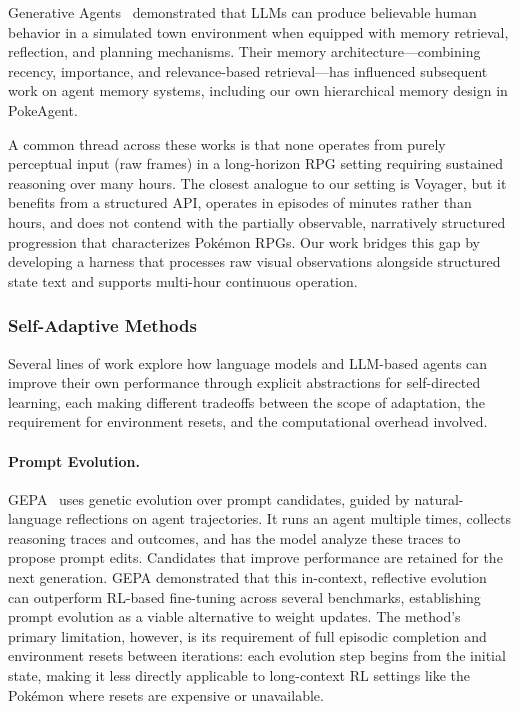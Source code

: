 Generative Agents~\citep{park2023generative} demonstrated that LLMs can produce believable human behavior in a simulated town environment when equipped with memory retrieval, reflection, and planning mechanisms. Their memory architecture---combining recency, importance, and relevance-based retrieval---has influenced subsequent work on agent memory systems, including our own hierarchical memory design in PokeAgent.

A common thread across these works is that none operates from purely perceptual input (raw frames) in a long-horizon RPG setting requiring sustained reasoning over many hours. The closest analogue to our setting is Voyager, but it benefits from a structured API, operates in episodes of minutes rather than hours, and does not contend with the partially observable, narratively structured progression that characterizes Pok\'{e}mon RPGs. Our work bridges this gap by developing a harness that processes raw visual observations alongside structured state text and supports multi-hour continuous operation.

\subsubsection{Self-Adaptive Methods}\label{sec:self_adaptation}

Several lines of work explore how language models and LLM-based agents can improve their own performance through explicit abstractions for self-directed learning, each making different tradeoffs between the scope of adaptation, the requirement for environment resets, and the computational overhead involved.

\paragraph{Prompt Evolution.} GEPA~\citep{agrawal2025gepa} uses genetic evolution over prompt candidates, guided by natural-language reflections on agent trajectories. It runs an agent multiple times, collects reasoning traces and outcomes, and has the model analyze these traces to propose prompt edits. Candidates that improve performance are retained for the next generation. GEPA demonstrated that this in-context, reflective evolution can outperform RL-based fine-tuning across several benchmarks, establishing prompt evolution as a viable alternative to weight updates. The method's primary limitation, however, is its requirement of full episodic completion and environment resets between iterations: each evolution step begins from the initial state, making it less directly applicable to long-context RL settings like the Pok\'emon where resets are expensive or unavailable.

